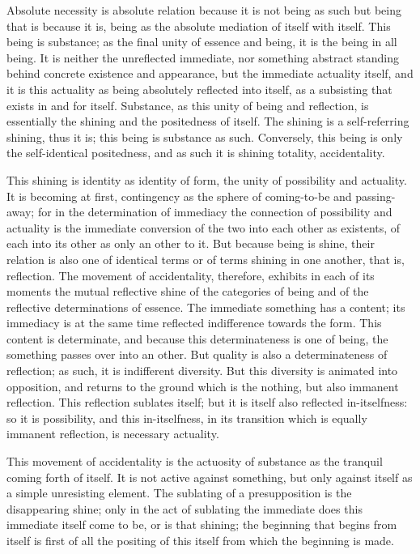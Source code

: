 Absolute necessity is absolute relation
because it is not being as such
but being that is because it is,
being as the absolute mediation
of itself with itself.
This being is substance;
as the final unity of essence and being,
it is the being in all being.
It is neither the unreflected immediate,
nor something abstract standing behind
concrete existence and appearance,
but the immediate actuality itself,
and it is this actuality
as being absolutely reflected into itself,
as a subsisting that exists in and for itself.
Substance, as this unity of being and reflection,
is essentially the shining and the positedness of itself.
The shining is a self-referring shining, thus it is;
this being is substance as such.
Conversely, this being is only the self-identical positedness,
and as such it is shining totality, accidentality.

This shining is identity as identity of form,
the unity of possibility and actuality.
It is becoming at first,
contingency as the sphere of
coming-to-be and passing-away;
for in the determination of immediacy
the connection of possibility and actuality is
the immediate conversion of the two
into each other as existents,
of each into its other as only an other to it.
But because being is shine,
their relation is also one of identical terms
or of terms shining in one another, that is, reflection.
The movement of accidentality, therefore,
exhibits in each of its moments the mutual
reflective shine of the categories of being
and of the reflective determinations of essence.
The immediate something has a content;
its immediacy is at the same time
reflected indifference towards the form.
This content is determinate,
and because this determinateness is one of being,
the something passes over into an other.
But quality is also a determinateness of reflection;
as such, it is indifferent diversity.
But this diversity is animated into opposition,
and returns to the ground which is the nothing,
but also immanent reflection.
This reflection sublates itself;
but it is itself also reflected in-itselfness:
so it is possibility, and this in-itselfness,
in its transition which is equally immanent reflection,
is necessary actuality.

This movement of accidentality is the actuosity of substance
as the tranquil coming forth of itself.
It is not active against something,
but only against itself as a simple unresisting element.
The sublating of a presupposition is the disappearing shine;
only in the act of sublating the immediate does this
immediate itself come to be, or is that shining;
the beginning that begins from itself is first of all
the positing of this itself from which the beginning is made.


